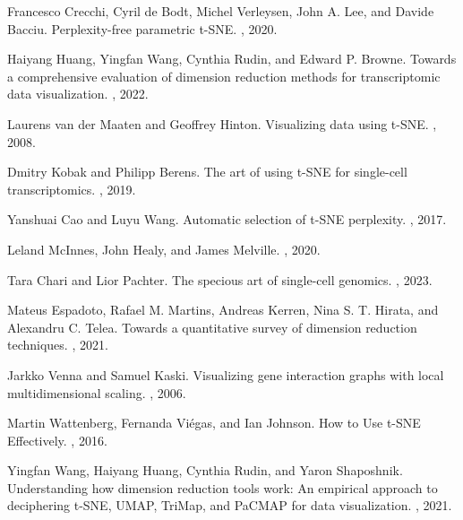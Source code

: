 \documentclass{article}
\begin{document}



\begin{thebibliography}{10}

Francesco Crecchi, Cyril de Bodt, Michel Verleysen, John A. Lee, and Davide Bacciu.
\newblock Perplexity-free parametric t-SNE.
, 2020.

Haiyang Huang, Yingfan Wang, Cynthia Rudin, and Edward P. Browne.
\newblock Towards a comprehensive evaluation of dimension reduction methods for transcriptomic data visualization.
, 2022.

Laurens van der Maaten and Geoffrey Hinton.
\newblock Visualizing data using t-SNE.
, 2008.

Dmitry Kobak and Philipp Berens.
\newblock The art of using t-SNE for single-cell transcriptomics.
, 2019.

Yanshuai Cao and Luyu Wang. 
\newblock Automatic selection of t-SNE perplexity.
, 2017.

\newblock Leland McInnes, John Healy, and James Melville.
, 2020.

Tara Chari and Lior Pachter.
\newblock The specious art of single-cell genomics.
,  2023.

Mateus Espadoto, Rafael M. Martins, Andreas Kerren, Nina S. T. Hirata, and Alexandru C. Telea.
\newblock Towards a quantitative survey of dimension reduction techniques.
, 2021.

Jarkko Venna and Samuel Kaski.
\newblock Visualizing gene interaction graphs with local multidimensional scaling.
, 2006.

Martin Wattenberg, Fernanda Vi\'egas, and Ian Johnson.
\newblock How to Use t-SNE Effectively.
, 2016.

Yingfan Wang, Haiyang Huang, Cynthia Rudin, and Yaron Shaposhnik.
\newblock Understanding how dimension reduction tools work: An empirical approach to deciphering t-SNE, UMAP, TriMap, and PaCMAP for data visualization.
, 2021.


\end{thebibliography}
\end{document}
